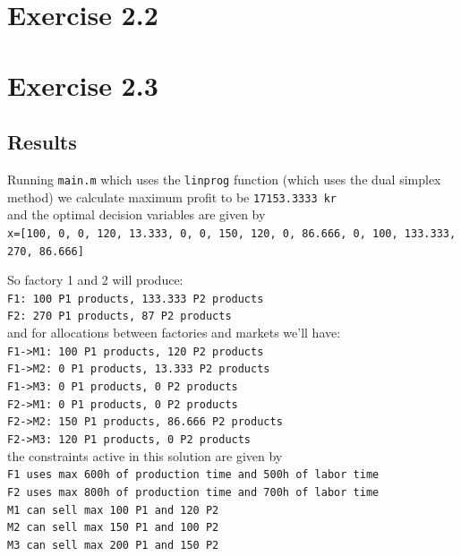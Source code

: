 \documentclass{assignment}
\def\code#1{\texttt{#1}}
\begin{document}
\newpage
\section{Exercise 2.2}
\begin{myBox}
    
\end{myBox}

\newpage


\section{Exercise 2.3}
\subsection*{Results}

Running \code{main.m} which uses the \code{linprog} function (which uses the dual simplex method) we calculate maximum profit to be \code{17153.3333 kr} \\
and the optimal decision variables are given by \\
\code{x=[100,
     0,
     0,
   120,
    13.333,
     0,
     0,
   150,
   120,
     0,
    86.666,
     0,
   100,
   133.333,
   270,
86.666]}
 
So factory 1 and 2 will produce: \\
\code{F1: 100 P1 products, 133.333 P2 products} \\
\code{F2: 270 P1 products, 87 P2 products} \\

and for allocations between factories and markets we'll have: \\
\code{F1->M1: 100 P1 products, 120 P2 products}\\
\code{F1->M2: 0 P1 products, 13.333 P2 products}\\
\code{F1->M3: 0 P1 products, 0 P2 products}\\
\code{F2->M1: 0 P1 products, 0 P2 products}\\
\code{F2->M2: 150 P1 products, 86.666 P2 products}\\
\code{F2->M3: 120 P1 products, 0 P2 products} \\
the constraints active in this solution are given by \\
\code{F1 uses max 600h of production time and 500h of labor time}\\
\code{F2 uses max 800h of production time and 700h of labor time}\\
\code{M1 can sell max 100 P1 and 120 P2}\\
\code{M2 can sell max 150 P1 and 100 P2}\\
\code{M3 can sell max 200 P1 and 150 P2}
\end{document}
